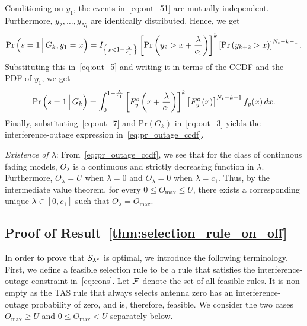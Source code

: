 \documentclass[12pt,draftcls,peerreview,onecolumn]{IEEEtran}
\newcommand{\brac}[1]{\left({#1}\right)}
\newcommand{\cbrac}[1]{\left\{{#1}\right\}}
\newcommand{\indic}[1]{I_{\cbrac{#1}}}
\newcommand{\prob}[1]{\text{Pr}\brac{#1}}
\newcommand{\given}{\arrowvert}
\newcommand{\Given}{\Big\arrowvert}
\newcommand{\setG}{G}
\newcommand{\setGk}{\setG_k}
\newcommand{\lam}{\lambda}
\newcommand{\F}{\cal{F}}
\newcommand{\Nt}{{N_t}}
\newcommand{\outmax}{O_{\text{max}}}
\newcommand{\cone}{c_{1}}
\newcommand{\out}{O}
\newcommand{\lambym}{\frac{\lam}{\cone}}
\newcommand{\yk}[1]{y_{#1}}
\newcommand{\un}{U}
\newcommand{\outlam}{\out_{\lam}}
\newcommand{\callamstarrule}{\cal S_{\lam^{*}}}
\begin{document}
Conditioning on $\yk{1}$, the events in~\eqref{eq:out_51} are mutually independent. Furthermore, $\yk{2},\ldots,\yk{\Nt} $ are identically distributed. Hence, we get
%
\begin{equation}
\text{Pr}\brac{s=1\Given \setGk, \yk{1}=x} = \indic{x<1-\lambym}\left[\text{Pr}\brac{\yk{2}>x+\lambym}\right]^{k} \left[\text{Pr}\brac{\yk{k+2}>x}\right]^{\Nt-k-1}.
\label{eq:out_6}
\end{equation}
%
Substituting this in~\eqref{eq:out_5} and writing it in terms of the CCDF and the PDF of $\yk{1}$, we get 
\begin{equation}
\text{Pr}\brac{s=1\Given\setGk} =\int_{0}^{1-\lambym}\left[F_{y}^{c}\left(x+\lambym\right)\right]^k \left[F_{y}^{c}\left(x\right)\right]^{\Nt-k-1}f_{y}(x)\,dx.
\label{eq:out_7}
\end{equation}
Finally, substituting~\eqref{eq:out_7} and $\prob{\setGk}$ in~\eqref{eq:out_3} yields the interference-outage expression in~\eqref{eq:pr_outage_ccdf}. 

{\em Existence of $\lam$}: From~\eqref{eq:pr_outage_ccdf}, we see that for the class of continuous fading models, $\outlam$ is a continuous and strictly decreasing  function in $\lam$. %
Furthermore, $\outlam=\un$ when $\lam=0$ and $\outlam=0$ when $\lam=\cone$. Thus, by the intermediate value theorem, for every $0\leq\outmax\leq\un$,  there exists a corresponding unique $\lam\in[0,\cone]$ such that $\outlam=\outmax$. 
  

		

\subsection{Proof of Result~\ref{thm:selection_rule_on_off}}
\label{proof:selection_rule_on_off}
In order to prove that $\callamstarrule$ is optimal, we introduce the following terminology. First, we define a feasible selection rule to be a rule that satisfies the interference-outage constraint in~\eqref{eq:cons}. Let $\F$ denote the set of all feasible rules. It is non-empty as the TAS rule that always selects antenna zero has an interference-outage probability of zero, and is, therefore, feasible.  We consider the two cases $\outmax\geq\un$ and $0\leq\outmax<\un$ separately below.
\end{document}
